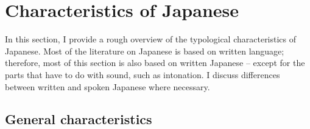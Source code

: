 

\section{Characteristics of Japanese}\label{BackSecCharJap}

In this section, I provide a rough overview of the typological characteristics of Japanese.
Most of the literature on Japanese is based on written language;
therefore, most of this section is also based on written Japanese -- except for the parts that have to do with sound, such as intonation.
I discuss differences between written and spoken Japanese where necessary.


\subsection{General characteristics}\label{BackSubSecGeneralChar}

